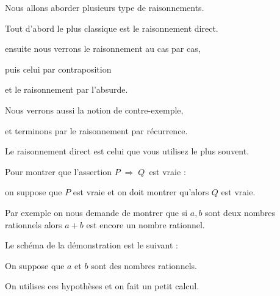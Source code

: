 


\renewcommand{\implies}{\; \Rightarrow\; } %






\debuttexte

\diapo

\change

Nous allons aborder plusieurs type de raisonnements.

\change

Tout d'abord le plus classique est le raisonnement direct.

\change

ensuite nous verrons le raisonnement au cas par cas,

\change

puis celui par contraposition


\change

et le raisonnement par l'absurde.

\change

Nous verrons aussi la notion de contre-exemple,

\change 

et terminons par le raisonnement par récurrence.


\diapo

Le raisonnement direct est celui que vous utilisez le plus souvent.

Pour montrer que l'assertion \og $P \implies Q$\fg\ est vraie :

on suppose que $P$ est vraie et on doit montrer qu'alors $Q$ est vraie.

\change

Par exemple on nous demande de montrer que si
$a,b$ sont deux nombres rationnels alors 
$a+b$ est encore un nombre rationnel.

\change

Le schéma de la démonstration est le suivant :

On suppose que $a$ et $b$ sont des nombres rationnels.

On utilises ces hypothèses et on fait un petit calcul.

\change

